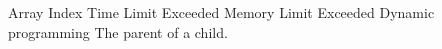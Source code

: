 %
%


 Array 
 Index
 Time Limit Exceeded
 Memory Limit Exceeded
 Dynamic programming 
 The parent of a child. 
